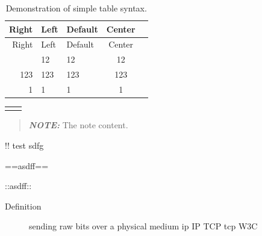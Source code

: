 \begin{longtable}[]{@{}rllcl@{}}
\caption{Demonstration of simple table syntax.}\tabularnewline
\toprule\noalign{}
Right & Left & Default & Center & \\
\midrule\noalign{}
\endfirsthead
\toprule\noalign{}
Right & Left & Default & Center & \\
\midrule\noalign{}
\endhead
\bottomrule\noalign{}
\endlastfoot
12 & 12 & 12 & 12 & \\
123 & 123 & 123 & 123 & \\
1 & 1 & 1 & 1 & \\
\end{longtable}

\begin{longtable}[]{@{}ll@{}}
\toprule\noalign{}
\endhead
\bottomrule\noalign{}
\endlastfoot
& \\
\end{longtable}

\begin{quote}
\textbf{\emph{NOTE:}} The note content.
\end{quote}

!! test sdfg

==asdff==

::asdff::

\begin{Shaded}
\begin{Highlighting}[]
\end{Highlighting}
\end{Shaded}

\begin{description}
\item[Definition]
sending raw bits over a physical medium ip IP TCP tcp W3C
\end{description}
